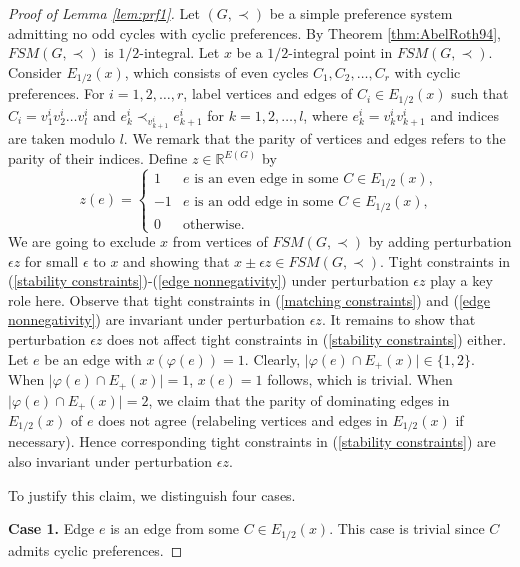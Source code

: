 \documentclass[11pt]{article}
\numberwithin{theorem}{section}
\begin{document}
\begin{proof}[Proof of Lemma \ref{lem:prf1}]
Let $(G,\prec)$ be a simple preference system admitting no odd cycles with cyclic preferences.
By Theorem \ref{thm:AbelRoth94}, $FSM(G,\prec)$ is $1/2$-integral.
Let $x$ be a $1/2$-integral point in $FSM(G, \prec)$.
Consider $E_{1/2}(x)$, which consists of even cycles $C_1,C_2,\ldots,C_r$ with cyclic preferences. For $i=1,2,\ldots,r$, label vertices and edges of $C_i\in E_{1/2}(x)$ such that $C_i=v^i_1v^i_2\ldots v^i_{l}$ and $e^i_k\prec_{v^i_{k+1}} e^i_{k+1}$ for $k=1,2,\ldots,l$, where $e^i_k=v^i_{k}v^i_{k+1}$ and indices are taken modulo $l$. 
We remark that the parity of vertices and edges refers to the parity of their indices. Define $z\in \mathbb{R}^{E(G)}$ by
\begin{equation*}
z(e)=
\begin{cases}
1 & e\text{ is an even edge in some }C \in E_{1/2}(x),\\
-1 & e\text{ is an odd edge in some }C \in E_{1/2}(x),\\
0 & \text{otherwise}.
\end{cases}
\end{equation*}
We are going to exclude $x$ from vertices of $FSM(G, \prec)$ by adding perturbation $\epsilon z$ for small $\epsilon$ to $x$ and showing that $x\pm\epsilon z\in FSM(G,\prec)$. 
Tight constraints in (\ref{stability constraints})-(\ref{edge nonnegativity}) under perturbation $\epsilon z$ play a key role here. Observe that tight constraints in (\ref{matching constraints}) and (\ref{edge nonnegativity}) are invariant under perturbation $\epsilon z$. It remains to show that perturbation $\epsilon z$ does not affect tight constraints in (\ref{stability constraints}) either. Let $e$ be an edge with $x(\varphi(e))=1$. Clearly, $\lvert \varphi(e)\cap E_+(x)\rvert \in\{1,2\}$. When $\lvert \varphi(e)\cap E_+(x)\rvert=1$, $x(e)=1$ follows, which is trivial. When $\lvert \varphi(e)\cap E_+(x)\rvert =2$, we claim that the parity of dominating edges in $E_{1/2}(x)$ of $e$ does not agree (relabeling vertices and edges in $E_{1/2}(x)$ if necessary).
Hence corresponding tight constraints in (\ref{stability constraints}) are also invariant under perturbation $\epsilon z$.

To justify this claim, we distinguish four cases.

\textbf{Case 1.} Edge $e$ is an edge from some $C\in E_{1/2}(x)$. This case is trivial since $C$ admits cyclic preferences.


\end{proof}
\end{document}
